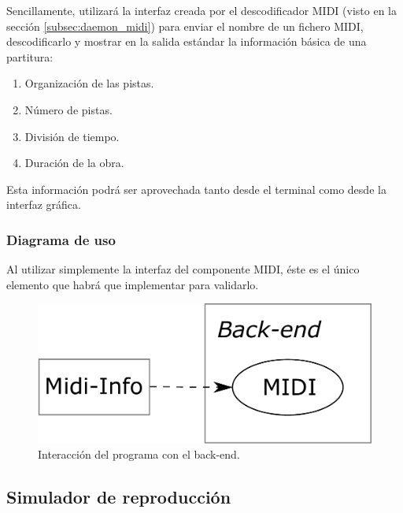 Sencillamente, utilizará la interfaz creada por el descodificador \acrshort{MIDI} (visto en la sección \ref{subsec:daemon_midi}) para enviar el nombre de un fichero \acrshort{MIDI}, descodificarlo y mostrar en la salida estándar la información básica de una partitura:

\begin{enumerate}
	\item Organización de las pistas.
	\item Número de pistas.
	\item División de tiempo.
	\item Duración de la obra.
\end{enumerate}

Esta información podrá ser aprovechada tanto desde el terminal como desde la interfaz gráfica.

\subsubsection{Diagrama de uso}

Al utilizar simplemente la interfaz del componente \acrshort{MIDI}, éste es el único elemento que habrá que implementar para validarlo.

\smallskip

\begin{figure}[H]
	\noindent \begin{centering}
		\includegraphics[width=\linewidth/3]{capitulo4/midi_info}
		\par\end{centering}
	\smallskip
	\caption{\label{fig:midi_info} Interacción del programa con el back-end.}
\end{figure} 

\smallskip

\subsection{Simulador de reproducción}

